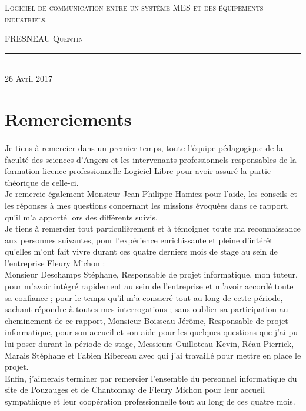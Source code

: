 \documentclass[a4paper,12pt]{extarticle}
\newcommand{\HRule}{\rule{\linewidth}{0.5mm}}
\begin{document}
\begin{titlepage}
\begin{sffamily}
\begin{center}
		\textsc{\LARGE Logiciel de communication entre un système MES et des équipements industriels.}\\[2cm] 
		
		\begin{minipage}{0.4\textwidth}
			\begin{flushleft} \large
				FRESNEAU \textsc{Quentin}
			\end{flushleft}
		\end{minipage}
		
		\vfill
		\HRule\\[2cm]
		{\large 26 Avril 2017}
		
		\end{center}
		\end{sffamily}
	\end{titlepage}
	\clearpage
	
	\tableofcontents
	\clearpage

	\section{Remerciements}
		\paragraph{}

	Je tiens à remercier dans un premier temps, toute l’équipe pédagogique de la faculté des sciences d’Angers et les intervenants professionnels responsables de la formation licence professionnelle Logiciel Libre pour avoir assuré la partie théorique de celle-ci.\\
Je remercie également Monsieur Jean-Philippe Hamiez pour l’aide, les conseils et les réponses à mes questions concernant les missions évoquées dans ce rapport, qu’il m’a apporté lors des différents suivis.\\
Je tiens à remercier tout particulièrement et à témoigner toute ma reconnaissance aux personnes suivantes, pour l’expérience enrichissante et pleine d’intérêt qu’elles m’ont fait vivre durant ces quatre derniers mois de stage au sein de l’entreprise Fleury Michon : \\
Monsieur Deschamps Stéphane, Responsable de projet informatique, mon tuteur, pour m’avoir intégré rapidement au sein de l’entreprise et m’avoir accordé toute sa confiance ; pour le temps qu’il m’a consacré tout au long de cette période, sachant répondre à toutes mes interrogations ; sans oublier sa participation au cheminement de ce rapport, Monsieur Boisseau Jérôme, Responsable de projet informatique, pour son accueil et son aide pour les quelques questions que j’ai pu lui poser durant la période de stage, Messieurs Guilloteau Kevin, Réau Pierrick, Marais Stéphane et Fabien Ribereau avec qui j’ai travaillé pour mettre en place le projet.\\
Enfin, j’aimerais terminer par remercier l’ensemble du personnel informatique du site de Pouzauges et de Chantonnay de Fleury Michon pour leur accueil sympathique et leur coopération professionnelle tout au long de ces quatre mois.\\
\end{document}
